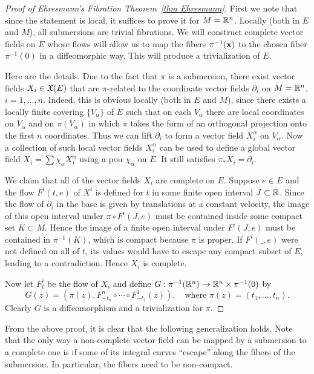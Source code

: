 \begin{proof}[Proof of Ehresmann's Fibration Theorem~\ref{thm Ehresmann}]\label{proof of Ehresmann thm}
    First we note that since the statement is local, it suffices to prove it for $M=\bbR^n$. Locally (both in $E$ and $M$), all submersions are trivial fibrations. We will construct complete vector fields on $E$ whose flows will allow us to map the fibers $\pi^{-1}(\bf{x})$ to the chosen fiber $\pi^{-1}(0)$ in a diffeomorphic way. This will produce a  trivialization of $E$.
    
    Here are the details. Due to the fact that $\pi$ is a submersion, there exist vector fields $X_i\in\fX(E)$ that are $\pi$-related to the coordinate vector fields $\partial_i$ on $M=\bbR^n$, $i=1,\ldots,n$. Indeed, this is obvious locally (both in $E$ and $M$), since there exists a locally finite covering $\{V_\alpha\}$ of $E$ such that on each $V_\alpha$ there are local coordinates on $V_\alpha$ and on $\pi(V_\alpha)$ in which $\pi$ takes the form of an orthogonal projection onto the first $n$ coordinates. Thus we can lift $\partial_i$ to form a vector field $X^\alpha_i$ on $V_\alpha$. Now a collection of such local vector fields $X_i^\alpha$ can be used to define a global vector field $X_i=\sum\chi_\alpha X_i^\alpha$ using a \gls{pou} $\chi_\alpha$ on $E$. It still satisfies $\pi_\ast X_i=\partial_i$.

    We claim that all of the vector fields $X_i$ are complete on $E$. Suppose $e\in E$ and the flow $F^i(t,e)$ of $X^i$ is defined for $t$ in some finite open interval $J\subset \bbR$. Since the flow of $\partial_i$ in the base is given by translations at a constant velocity, the image of this open interval under $\pi\circ F^i(J,e)$ must be contained inside some compact set $K\subset M$. Hence the image of a finite open interval under $F^i(J,e)$ must be contained in $\pi^{-1}(K)$, which is compact because $\pi$ is proper. If $F^i(\_,e)$ were not defined on all of $t$, its values would have to escape any compact subset of $E$, leading to a contradiction. Hence $X_i$ is complete.
    
    Now let $F^i_t$ be the flow of $X_i$ and define $G:\pi^{-1}(\bbR^n)\to \bbR^n\times \pi^{-1}(0)$ by 
    \[G(z)=\left(\pi(z),F^n_{-t_n}\circ \cdots\circ F^1_{-t_1}(z)\right),\quad \text{where }\pi(z)=(t_1,\ldots,t_n).\]
    Clearly $G$ is a diffeomorphism and a trivialization for $\pi$.
\end{proof}

From the above proof, it is clear that the following generalization holds. Note that the only way a non-complete vector field can be mapped by a submersion to a complete one is if some of its integral curves ``escape'' along the fibers of the submersion. In particular, the fibers need to be non-compact.

